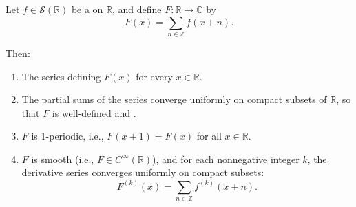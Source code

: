 \begin{proposition}
\label{proposition:periodized_schwartz_function_on_R_is_smooth_and_1_periodic}
Let $f \in \mathcal{S}(\mathbb{R})$ be a  on $\mathbb{R}$, and define $F : \mathbb{R} \to \mathbb{C}$ by
$$F(x) = \sum_{n \in \mathbb{Z}} f(x + n).$$

Then:
\begin{enumerate}
    \item The series defining $F(x)$  for every $x \in \mathbb{R}$.
    \label{item:periodized_schwartz_function_absolute_convergence}
    \item The partial sums of the series converge uniformly on compact subsets of $\mathbb{R}$, so that $F$ is well-defined and .
    \label{item:periodized_schwartz_function_uniform_convergence_on_compacta}
    \item $F$ is 1-periodic, i.e., $F(x+1) = F(x)$ for all $x \in \mathbb{R}$.
    \label{item:periodized_schwartz_function_1_periodic}
    \item $F$ is smooth (i.e., $F \in C^\infty(\mathbb{R})$), and for each nonnegative integer $k$, the derivative series converges uniformly on compact subsets:
    $$F^{(k)}(x) = \sum_{n \in \mathbb{Z}} f^{(k)}(x + n).$$
    \label{item:periodized_schwartz_function_smooth}
\end{enumerate}
\end{proposition}

